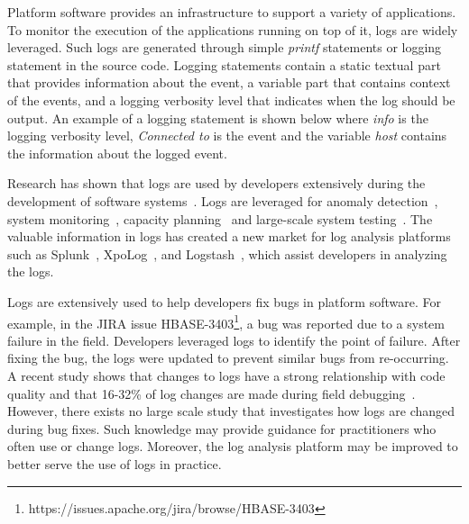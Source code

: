 Platform software provides an infrastructure to support a variety of applications. To monitor the execution of the applications
running on top of it, logs are widely leveraged. Such logs are generated through simple \textsl{printf} statements or logging statement in the source code. Logging statements contain a static textual part that provides information about the event, a variable part that contains context of the events, and a logging verbosity level that indicates when the log should be output. An example of a logging statement is shown below where \emph{info} is the logging verbosity level, \emph{Connected to} is the event and the variable \emph{host} contains the information about the logged event. 

%
% 

Research has shown that logs are used by developers extensively during the development of software systems~\cite{Characterizinglogs}. Logs are leveraged for anomaly detection~\cite{XUanomalies,ConsoleLogs,Marksyer}, system monitoring~\cite{Bitperformance}, capacity planning~\cite{IanWCRE} and large-scale system testing~\cite{markTesting}. The valuable information in logs has created a new market for log analysis platforms such as Splunk~\cite{Bitperformance}, XpoLog~\cite{Xpolog}, and Logstash~\cite{Logstash}, which assist developers in analyzing the logs.

 
Logs are extensively used to help developers fix bugs in platform software. For example, in the JIRA issue HBASE-3403\footnote{https://issues.apache.org/jira/browse/HBASE-3403}, a bug was reported due to a system failure in the field. Developers leveraged logs to identify the point of failure. After fixing the bug, the logs were updated to prevent similar bugs from re-occurring. A recent study shows that changes to logs have a strong relationship with code quality and that 16-32\%
of log changes are made during field debugging~\cite{EMSEIAN}. However, there exists no large scale study that investigates how logs are changed during bug fixes. Such knowledge may provide guidance for practitioners who often use or change logs. Moreover, the log analysis platform may be improved to better serve the use of logs in practice.



